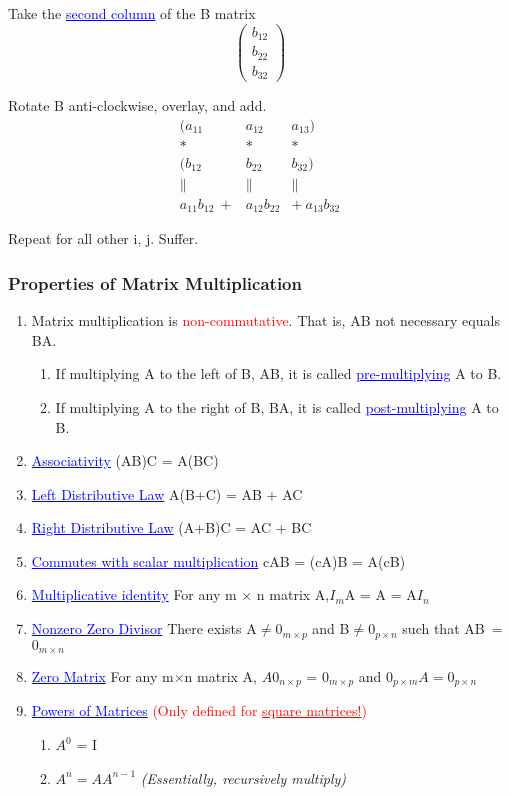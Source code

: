 \documentclass{article}
\newcommand{\bul}[1]{\textcolor{blue}{\underline{#1}}}
\begin{document}
Take the \bul{second column} of the B matrix
\[
\begin{pmatrix}
    b_{12} \\
    b_{22} \\ 
    b_{32}
\end{pmatrix}
\]

\vspace{10pt}

Rotate B anti-clockwise, overlay, and add.
\[
\begin{array}{ccc}
(a_{11} & a_{12} & a_{13}) \\
 * & * & *  \\
(b_{12} & b_{22} & b_{32}) \\
\parallel & \parallel & \parallel \\ 
a_{11}b_{12}\ +& a_{12}b_{22} &+\ a_{13}b_{32}
\end{array}
\]

\vspace{10pt}

Repeat for all other i, j. Suffer.

\subsubsection{Properties of Matrix Multiplication}
\begin{enumerate}
    \item Matrix multiplication is \textcolor{red}{non-commutative}. That is, AB not necessary equals BA.
    \begin{enumerate}
        \item If multiplying A to the left of B, AB, it is called \bul{pre-multiplying} A to B.
        \item If multiplying A to the right of B, BA, it is called \bul{post-multiplying} A to B.
    \end{enumerate}
    \item \bul{Associativity} (AB)C = A(BC)
    \item \bul{Left Distributive Law} A(B+C) = AB + AC
    \item \bul{Right Distributive Law} (A+B)C = AC + BC
    \item \bul{Commutes with scalar multiplication} cAB = (cA)B = A(cB)
    \item \bul{Multiplicative identity} For any m $\times$ n matrix A,\quad$I_{m}$A = A = A$I_{n}$
    \item \bul{Nonzero Zero Divisor} There exists A$\neq 0_{m \times p}$ and B$\neq 0_{p \times n}$ such that \mbox{AB = $0_{m \times n}$}
    \item \bul{Zero Matrix} For any m$\times$n matrix A, $A0_{n\times p}$ = $0_{m\times p}$ and $0_{p\times m}A=0_{p\times n}$
    \item \bul{Powers of Matrices} \textcolor{red}{(Only defined for \underline{square matrices!})}
    \begin{enumerate}
        \item $A^0$ = I
        \item $A^n = AA^{n-1}$ \textit{(Essentially, recursively multiply)}
    \end{enumerate}
\end{enumerate}
\end{document}
